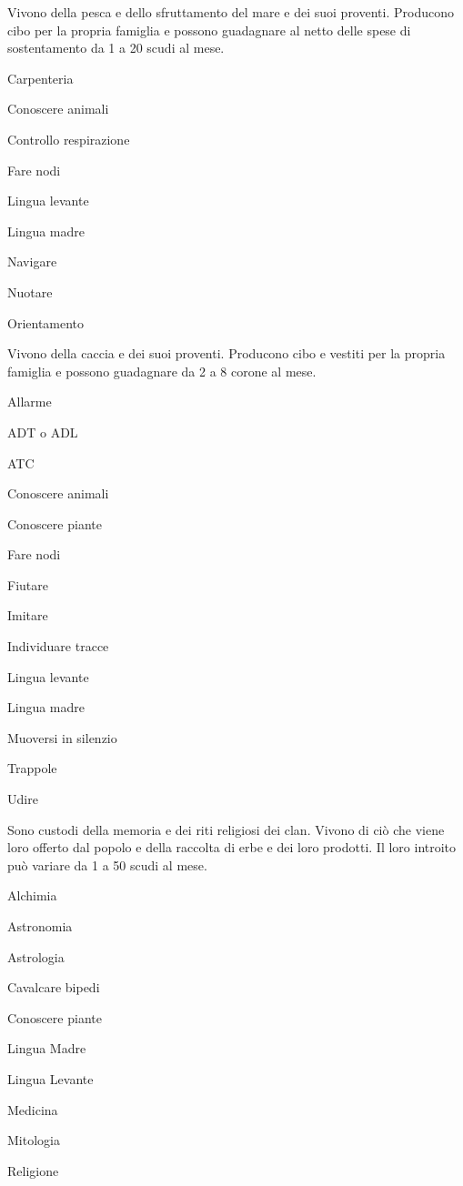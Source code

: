 
Vivono della pesca e dello sfruttamento del mare e dei suoi proventi.
Producono cibo per la propria famiglia e possono guadagnare al netto
delle spese di sostentamento da 1 a 20 scudi al mese.

\begin{abilist}
\item Carpenteria
\item Conoscere animali
\item Controllo respirazione
\item Fare nodi 
\item Lingua levante
\item Lingua madre
\item Navigare
\item Nuotare
\item Orientamento
\end{abilist}


Vivono della caccia e dei suoi proventi. Producono cibo e vestiti per
la propria famiglia e possono guadagnare da 2 a 8 corone al mese.

\begin{abilist}
\item Allarme
\item ADT o ADL
\item ATC
\item Conoscere animali
\item Conoscere piante
\item Fare nodi
\item Fiutare
\item Imitare
\item Individuare tracce
\item Lingua levante
\item Lingua madre
\item Muoversi in silenzio
\item Trappole
\item Udire
\end{abilist}


Sono custodi della memoria e dei riti religiosi dei clan. Vivono di
ci\`o che viene loro offerto dal popolo e della raccolta di erbe e
dei loro prodotti. Il loro introito pu\`o variare da 1 a 50 scudi al
mese.

\begin{abilist}
\item Alchimia
\item Astronomia
\item Astrologia
\item Cavalcare bipedi
\item Conoscere piante
\item Lingua Madre
\item Lingua Levante
\item Medicina
\item Mitologia
\item Religione
\end{abilist}

